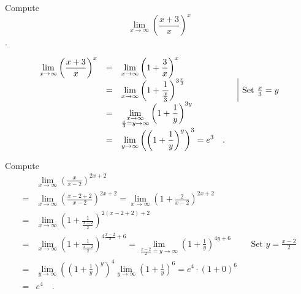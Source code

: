 \begin{frame}
\begin{example}
Compute \[\lim_{x\to \infty} \left(\frac{x+3}{x} \right)^{x}\].

\[
\begin{array}{rcll|l}
\displaystyle\lim\limits_{x\to \infty}\left(\frac{x+3}{x}\right)^x &=&\displaystyle  \lim\limits_{x\to \infty}\left(1+\frac{3}{x}\right)^x \\
&=& \displaystyle \lim\limits_{x\to \infty}\left(1+\frac{1}{\frac{x}{3}}\right)^{3\frac{x}{3} } && \text{Set } \frac{x}{3}=y\\
&=&\displaystyle \lim\limits_{\substack{x\to \infty \\ \frac{x}{3}=y\to \infty }}\left(1+\frac{1}{y}\right)^{3y} \\
&=&\displaystyle \displaystyle\lim\limits_{y\to \infty}\left(\left(1+\frac{1}{y}\right)^y\right)^3= e^3 \quad . 
\end{array}
\]

\end{example}
\end{frame}
\begin{frame}
\begin{example}
Compute 
\[
\begin{array}{rll|l}
&\displaystyle \lim_{x\to \infty} \left(\frac{x}{x-2} \right)^{2x+2}\\
=&\displaystyle
\lim\limits_{x\to \infty}\left(\frac{x-2 +2}{x-2} \right)^{2x+2}
= 
\lim\limits_{x\to \infty}\left(1+\frac{2}{x-2} \right)^{2x+2} \\
=&\displaystyle \lim\limits_{x\to \infty}\left(1+\frac{1}{\frac{x-2}{2}} \right)^{2(x-2+2)+2}\\
=&\displaystyle \lim\limits_{x\to \infty}\left(1+\frac{1}{\frac{x-2}{2}} \right)^{4\frac{x-2}{2}+6} = \displaystyle \lim\limits_{\frac{x-2}{2}
= y\to\infty} \left(1+\frac{1}{y}\right)^{4y+6}  && \text{Set } y=\frac{x-2}{2}\\
=&\displaystyle \lim\limits_{y\to \infty} \left(\left(1+\frac{1}{y} \right)^{y}\right)^4 \lim\limits_{y\to\infty} \left(1+\frac{1}{y}\right)^6 =e^4\cdot (1+0)^6\\
=& e^4
\quad . 
\end{array}
\]

\end{example}
\end{frame}
